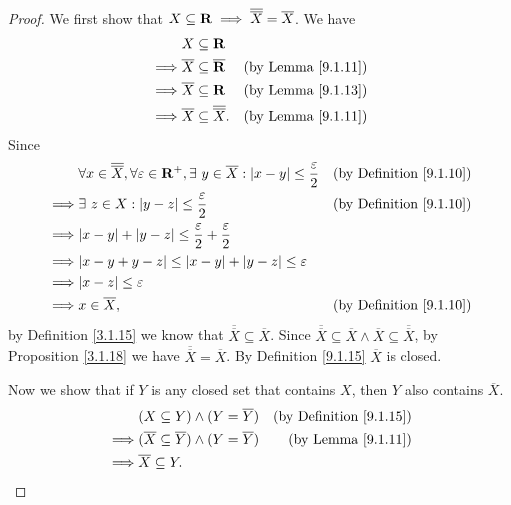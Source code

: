 \begin{proof}
    We first show that \(X \subseteq \mathbf{R} \implies \overline{\overline{X}} = \overline{X}\).
    We have
    \begin{align*}
                 & X \subseteq \mathbf{R}                                                                   \\
        \implies & \overline{X} \subseteq \overline{\mathbf{R}}            & \text{(by Lemma \ref{9.1.11})} \\
        \implies & \overline{X} \subseteq \mathbf{R}                       & \text{(by Lemma \ref{9.1.13})} \\
        \implies & \overline{X} \subseteq \overline{\overline{X}}. & \text{(by Lemma \ref{9.1.11})}
    \end{align*}
    Since
    \begin{align*}
                 & \forall x \in \overline{\overline{X}}, \forall \varepsilon \in \R^+, \exists\ y \in \overline{X} : \abs{x - y} \leq \frac{\varepsilon}{2} & \text{(by Definition \ref{9.1.10})} \\
        \implies & \exists\ z \in X : \abs{y - z} \leq \frac{\varepsilon}{2}                                                                                 & \text{(by Definition \ref{9.1.10})} \\
        \implies & \abs{x - y} + \abs{y - z} \leq \frac{\varepsilon}{2} + \frac{\varepsilon}{2}                                                                                                    \\
        \implies & \abs{x - y + y - z} \leq \abs{x - y} + \abs{y - z} \leq \varepsilon                                                                                                             \\
        \implies & \abs{x - z} \leq \varepsilon                                                                                                                                                    \\
        \implies & x \in \overline{X},                                                                                                                       & \text{(by Definition \ref{9.1.10})}
    \end{align*}
    by Definition \ref{3.1.15} we know that \(\overline{\overline{X}} \subseteq \overline{X}\).
    Since \(\overline{\overline{X}} \subseteq \overline{X} \land \overline{X} \subseteq \overline{\overline{X}}\), by Proposition \ref{3.1.18} we have \(\overline{\overline{X}} = \overline{X}\).
    By Definition \ref{9.1.15} \(\overline{X}\) is closed.

    Now we show that if \(Y\) is any closed set that contains \(X\), then \(Y\) also contains \(\overline{X}\).
    \begin{align*}
                 & (X \subseteq Y) \land (Y = \overline{Y})                       & \text{(by Definition \ref{9.1.15})} \\
        \implies & (\overline{X} \subseteq \overline{Y}) \land (Y = \overline{Y}) & \text{(by Lemma \ref{9.1.11})}      \\
        \implies & \overline{X} \subseteq Y.
    \end{align*}
\end{proof}

